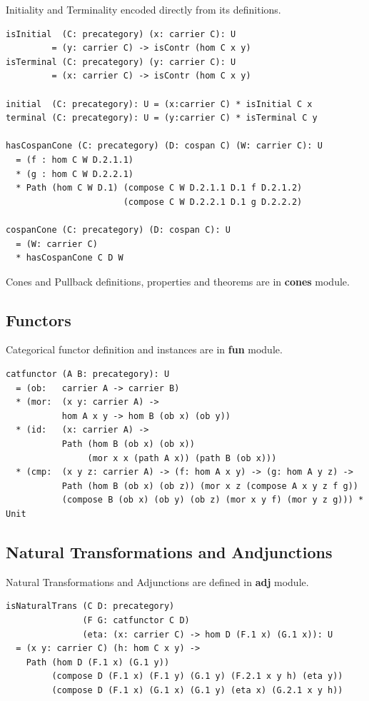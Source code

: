 \documentclass{article}
\begin{document}
Initiality and Terminality encoded directly from its definitions.

\begin{lstlisting}[mathescape=true]
isInitial  (C: precategory) (x: carrier C): U
         = (y: carrier C) -> isContr (hom C x y)
isTerminal (C: precategory) (y: carrier C): U
         = (x: carrier C) -> isContr (hom C x y)

initial  (C: precategory): U = (x:carrier C) * isInitial C x
terminal (C: precategory): U = (y:carrier C) * isTerminal C y

hasCospanCone (C: precategory) (D: cospan C) (W: carrier C): U
  = (f : hom C W D.2.1.1)
  * (g : hom C W D.2.2.1)
  * Path (hom C W D.1) (compose C W D.2.1.1 D.1 f D.2.1.2)
                       (compose C W D.2.2.1 D.1 g D.2.2.2)

cospanCone (C: precategory) (D: cospan C): U
  = (W: carrier C)
  * hasCospanCone C D W
\end{lstlisting}

Cones and Pullback definitions, properties and theorems are in {\bf cones} module.

\subsection{Functors}

Categorical functor definition and instances are in {\bf fun} module.

\begin{lstlisting}[mathescape=true]
catfunctor (A B: precategory): U
  = (ob:   carrier A -> carrier B)
  * (mor:  (x y: carrier A) ->
           hom A x y -> hom B (ob x) (ob y))
  * (id:   (x: carrier A) ->
           Path (hom B (ob x) (ob x))
                (mor x x (path A x)) (path B (ob x)))
  * (cmp:  (x y z: carrier A) -> (f: hom A x y) -> (g: hom A y z) ->
           Path (hom B (ob x) (ob z)) (mor x z (compose A x y z f g))
           (compose B (ob x) (ob y) (ob z) (mor x y f) (mor y z g))) * Unit
\end{lstlisting}

\subsection{Natural Transformations and Andjunctions}

Natural Transformations and Adjunctions are defined in {\bf adj} module.

\begin{lstlisting}[mathescape=true]
isNaturalTrans (C D: precategory)
               (F G: catfunctor C D)
               (eta: (x: carrier C) -> hom D (F.1 x) (G.1 x)): U
  = (x y: carrier C) (h: hom C x y) ->
    Path (hom D (F.1 x) (G.1 y))
         (compose D (F.1 x) (F.1 y) (G.1 y) (F.2.1 x y h) (eta y))
         (compose D (F.1 x) (G.1 x) (G.1 y) (eta x) (G.2.1 x y h))
\end{lstlisting}
\end{document}
